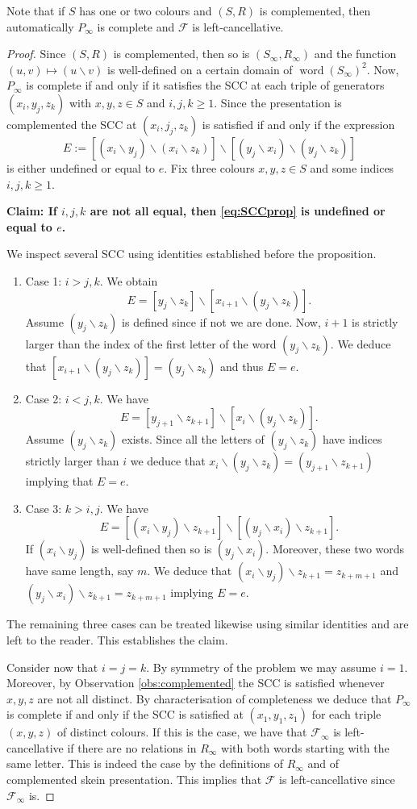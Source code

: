 \documentclass[a4paper, 12pt]{amsart}
\numberwithin{equation}{section}
\theoremstyle{definition}
\newcommand{\bs}{\backslash}
\newcommand{\cF}{\mathcal F}
\DeclareMathOperator{\word}{word}
\begin{document}
Note that if $S$ has one or two colours and $(S,R)$ is complemented, then automatically $P_\infty$ is complete and $\cF$ is left-cancellative.

\begin{proof}
Since $(S,R)$ is complemented, then so is $(S_\infty,R_\infty)$ and the function $(u,v)\mapsto (u\bs v)$ is well-defined on a certain domain of $\word(S_\infty)^2.$
Now, $P_\infty$ is complete if and only if it satisfies the SCC at each triple of generators $(x_i,y_j,z_k)$ with $x,y,z\in S$ and $i,j,k\geq 1$.
Since the presentation is complemented the SCC at $(x_i,j_j,z_k)$ is satisfied if and only if the expression
\begin{equation}\label{eq:SCCprop}E:=[(x_i\bs y_j)\bs (x_i\bs z_k)]\bs [(y_j\bs x_i)\bs (y_j\bs z_k)]\end{equation}
is either undefined or equal to $e$.
Fix three colours $x,y,z\in S$ and some indices $i,j,k\geq 1$.

{\bf Claim: If $i,j,k$ are not all equal, then \eqref{eq:SCCprop} is undefined or equal to $e$.}

We inspect several SCC using identities established before the proposition.
\begin{enumerate}
\item Case 1: $i>j,k$.
We obtain
$$E=[ y_j\bs z_k]\bs [x_{i+1} \bs (y_j\bs z_k)].$$
Assume $(y_j\bs z_k)$ is defined since if not we are done.
Now, $i+1$ is strictly larger than the index of the first letter of the word $(y_j\bs z_k)$.
We deduce that $[x_{i+1} \bs (y_j\bs z_k)]= (y_j\bs z_k)$ and thus $E=e$.
\item Case 2: $i<j,k$.
We have
$$E=[y_{j+1}\bs z_{k+1}]\bs [ x_i \bs (y_j\bs z_k)].$$
Assume $(y_j\bs z_k)$ exists.
Since all the letters of $(y_j\bs z_k)$ have indices strictly larger than $i$ we deduce that $x_i \bs (y_j\bs z_k)= (y_{j+1}\bs z_{k+1})$ implying that $E=e$.
\item Case 3: $k>i,j$.
We have 
$$E=[(x_i\bs y_j)\bs z_{k+1}]\bs [(y_j\bs x_i) \bs z_{k+1}].$$
If $(x_i\bs y_j)$ is well-defined then so is $(y_j\bs x_i).$
Moreover, these two words have same length, say $m$.
We deduce that $(x_i\bs y_j)\bs z_{k+1}=z_{k+m+1}$ and $(y_j\bs x_i) \bs z_{k+1}=z_{k+m+1}$ implying $E=e$.
\end{enumerate}
The remaining three cases can be treated likewise using similar identities and are left to the reader. This establishes the claim.

Consider now that $i=j=k$. By symmetry of the problem we may assume $i=1.$
Moreover, by Observation \ref{obs:complemented} the SCC is satisfied whenever $x,y,z$ are not all distinct.
By characterisation of completeness we deduce that $P_\infty$ is complete if and only if the SCC is satisfied at $(x_1,y_1,z_1)$ for each triple $(x,y,z)$ of distinct colours.
If this is the case, we have that $\cF_\infty$ is left-cancellative if there are no relations in $R_\infty$ with both words starting with the same letter. 
This is indeed the case by the definitions of $R_\infty$ and of complemented skein presentation.
This implies that $\cF$ is left-cancellative since $\cF_\infty$ is.
\end{proof}
\end{document}
